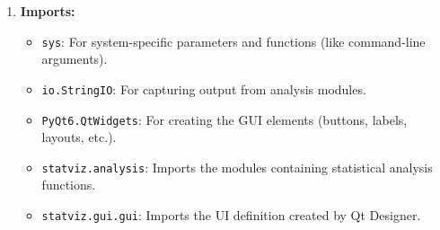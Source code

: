 \documentclass{article}
\begin{document}
\begin{enumerate}
    \item \textbf{Imports:}
    \begin{itemize}
        \item  \texttt{sys}: For system-specific parameters and functions (like command-line arguments).
        \item \texttt{io.StringIO}: For capturing output from analysis modules.
        \item \texttt{PyQt6.QtWidgets}: For creating the GUI elements (buttons, labels, layouts, etc.).
        \item \texttt{statviz.analysis}: Imports the modules containing statistical analysis functions.
        \item \texttt{statviz.gui.gui}: Imports the UI definition created by Qt Designer.
    \end{itemize}


\end{enumerate}
\end{document}

